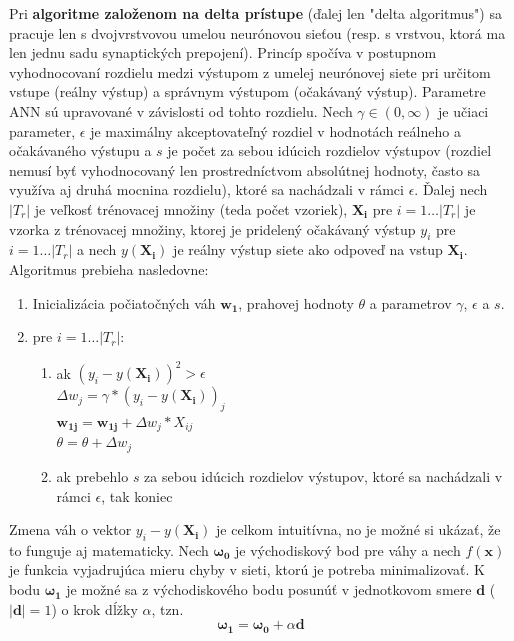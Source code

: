 Pri \textbf{algoritme založenom na delta prístupe} (ďalej len "delta algoritmus") sa pracuje len s dvojvrstvovou
umelou neurónovou sieťou (resp. s vrstvou, ktorá ma len jednu sadu synaptických prepojení).
Princíp spočíva v postupnom vyhodnocovaní rozdielu medzi výstupom z umelej neurónovej siete pri určitom vstupe
(reálny výstup) a správnym výstupom (očakávaný výstup).
Parametre ANN sú upravované v závislosti od tohto rozdielu.
Nech $\gamma \in (0, \infty)$ je učiaci parameter, $\epsilon$ je maximálny akceptovateľný rozdiel v hodnotách reálneho
a očakávaného výstupu a $s$ je počet za sebou idúcich rozdielov výstupov (rozdiel nemusí byť vyhodnocovaný len
prostredníctvom absolútnej hodnoty, často sa využíva aj druhá mocnina rozdielu), ktoré sa nachádzali v rámci $\epsilon$.
Ďalej nech $|T_r|$ je veľkosť trénovacej množiny (teda počet vzoriek), $\mathbf{X_i}$ pre $i=1 \dots |T_r|$ je vzorka
z trénovacej množiny, ktorej je pridelený očakávaný výstup $y_i$ pre $i=1 \dots |T_r|$ a nech $y(\mathbf{X_i})$ je reálny
výstup siete ako odpoveď na vstup $\mathbf{X_i}$.
Algoritmus prebieha nasledovne:
\begin{enumerate}
    \item Inicializácia počiatočných váh $\pmb{w_1}$, prahovej hodnoty $\theta$ a parametrov $\gamma$, $\epsilon$ a $s$.
    \item pre $i = 1 \dots |T_r|$:
    \begin{enumerate}
        \item ak $(y_i-y(\mathbf{X_i}))^2>\epsilon$ \\
                $\Delta{w_j} = \gamma * (y_i-y(\mathbf{X_i}))_j$ \\
                $\pmb{w_{1j}}=\pmb{w_{1j}} + \Delta{w_j} * X_{ij}$ \\
                $\theta=\theta + \Delta{w_j}$
        \item ak prebehlo $s$ za sebou idúcich rozdielov výstupov, ktoré sa nachádzali v rámci $\epsilon$, tak koniec
    \end{enumerate}
\end{enumerate}
Zmena váh o vektor $y_i-y(\mathbf{X_i})$ je celkom intuitívna, no je možné si ukázať, že to funguje aj matematicky.
Nech $\pmb{\omega_0}$ je východiskový bod pre váhy a nech $f(\pmb{x})$ je funkcia vyjadrujúca mieru chyby v sieti,
ktorú je potreba minimalizovať.
K bodu $\pmb{\omega_1}$ je možné sa z východiskového bodu posunúť v jednotkovom smere $\pmb{d}$ ($|\pmb{d}|=1$) o krok
dĺžky $\alpha$, tzn.
\begin{equation}
    \pmb{\omega_1} = \pmb{\omega_0} + \alpha\pmb{d}
\end{equation}
